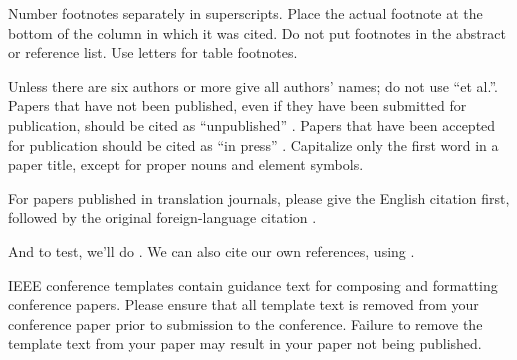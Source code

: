 \documentclass[conference]{IEEEtran}
\begin{document}
Number footnotes separately in superscripts. Place the actual footnote at 
the bottom of the column in which it was cited. Do not put footnotes in the 
abstract or reference list. Use letters for table footnotes.

Unless there are six authors or more give all authors' names; do not use 
``et al.''. Papers that have not been published, even if they have been 
submitted for publication, should be cited as ``unpublished'' \cite{report:zhu2024scalable}. Papers 
that have been accepted for publication should be cited as ``in press'' \cite{report:zhu2024scalable}. 
Capitalize only the first word in a paper title, except for proper nouns and 
element symbols.

For papers published in translation journals, please give the English 
citation first, followed by the original foreign-language citation \cite{report:zhu2024scalable}.

And to test, we'll do \cite{IEEEexample:bluebookstandard}. We can also cite our own references, using \cite{report:zhu2024scalable}.

\color{black}



\vspace{12pt}

\color{red}
IEEE conference templates contain guidance text for composing and formatting conference papers. Please ensure that all template text is removed from your conference paper prior to submission to the conference. Failure to remove the template text from your paper may result in your paper not being published.
\end{document}
